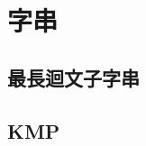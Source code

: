 %         
%         

\section{字串}
    \subsection{最長迴文子字串}
        
    \subsection{KMP}
        
%         
%         
    

